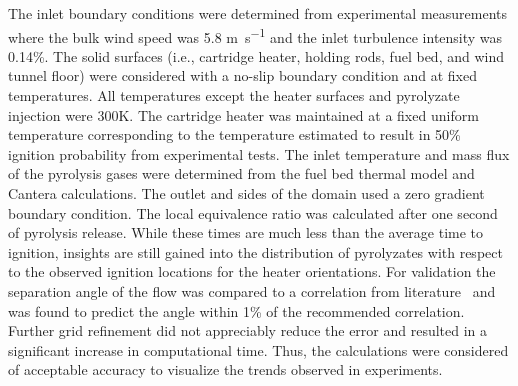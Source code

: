      The inlet boundary conditions were determined from experimental measurements where the bulk wind speed was 5.8 \si{\meter\per\second} and the inlet turbulence intensity was 0.14\%. The solid surfaces (i.e., cartridge heater, holding rods, fuel bed, and wind tunnel floor) were considered with a no-slip boundary condition and at fixed temperatures. All temperatures except the heater surfaces and pyrolyzate injection were 300\si{\kelvin}. The cartridge heater was maintained at a fixed uniform temperature corresponding to the temperature estimated to result in 50\% ignition probability from experimental tests. The inlet temperature and mass flux of the pyrolysis gases were determined from the fuel bed thermal model and Cantera calculations.  The outlet and sides of the domain used a zero gradient boundary condition. The local equivalence ratio was calculated after one second of pyrolysis release. While these times are much less than the average time to ignition, insights are still gained into the distribution of pyrolyzates with respect to the observed ignition locations for the heater orientations. For validation the separation angle of the flow was compared to a correlation from literature~\cite{Jiang2020SeparationRegime} and was found to predict the angle within 1\% of the recommended correlation. Further grid refinement did not appreciably reduce the error and resulted in a significant increase in computational time. Thus, the calculations were considered of acceptable accuracy to visualize the trends observed in experiments.
    
